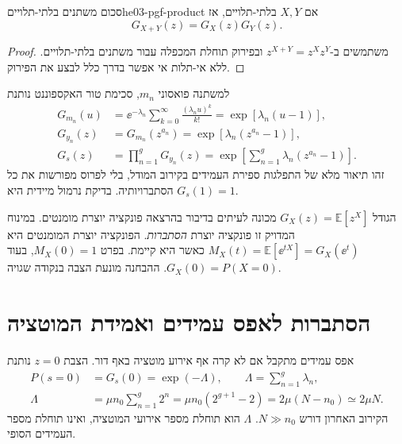 \begin{proposition}{סכום משתנים בלתי-תלויים}{he03-pgf-product}
אם $X,Y$ בלתי-תלויים, אז
\begin{equation}\label{eq:he03-pgf-product}
G_{X+Y}(z)=G_X(z)G_Y(z).
\end{equation}
\end{proposition}
\begin{proof}
משתמשים ב-$z^{X+Y}=z^Xz^Y$ ובפירוק תוחלת המכפלה עבור משתנים בלתי-תלויים. ללא אי-תלות אי אפשר בדרך כלל לבצע את הפירוק.
\end{proof}

למשתנה פואסוני $m_n$, סכימת טור האקספוננט נותנת
\begin{align}
G_{m_n}(u)&=\ee^{-\lambda_n}\sum_{k=0}^\infty\frac{(\lambda_nu)^k}{k!}
=\exp[\lambda_n(u-1)],\label{eq:he03-poisson-pgf}\\
G_{y_n}(z)&=G_{m_n}(z^{a_n})
=\exp[\lambda_n(z^{a_n}-1)],\label{eq:he03-weighted-pgf}\\
G_s(z)&=\prod_{n=1}^g G_{y_n}(z)
=\boxed{\exp\!\left[\sum_{n=1}^g\lambda_n(z^{a_n}-1)\right]}.\label{eq:he03-total-pgf}
\end{align}
זהו תיאור מלא של התפלגות ספירת העמידים בקירוב המודל, בלי לפרוס מפורשות את כל הסתברויותיה. בדיקת נרמול מיידית היא $G_s(1)=1$.

\begin{remark}
הגודל $G_X(z)=\mathbb{E}[z^X]$ מכונה לעיתים בדיבור בהרצאה פונקציה יוצרת מומנטים. במינוח המדויק זו פונקציה יוצרת \emph{הסתברות}. הפונקציה יוצרת המומנטים היא $M_X(t)=\mathbb{E}[\ee^{tX}]=G_X(\ee^t)$ כאשר היא קיימת. בפרט $M_X(0)=1$, בעוד $G_X(0)=P(X=0)$. ההבחנה מונעת הצבה בנקודה שגויה.
\end{remark}

\section{הסתברות לאפס עמידים ואמידת המוטציה}\label{sec:he03-mle}
אפס עמידים מתקבל אם לא קרה אף אירוע מוטציה באף דור. הצבת $z=0$ נותנת
\begin{align}
P(s=0)&=G_s(0)=\exp(-\Lambda),\qquad \Lambda=\sum_{n=1}^g\lambda_n,\label{eq:he03-zero}\\
\Lambda&=\mu n_0\sum_{n=1}^g2^n
=\mu n_0(2^{g+1}-2)=2\mu(N-n_0)\simeq2\mu N.\label{eq:he03-lambda}
\end{align}
הקירוב האחרון דורש $N\gg n_0$. $\Lambda$ הוא תוחלת מספר אירועי המוטציה, ואינו תוחלת מספר העמידים הסופי.

